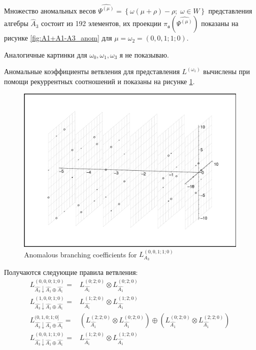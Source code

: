 \documentclass[a4paper,12pt]{article}
\theoremstyle{definition} \newtheorem{Def}{Definition}
\begin{document}
Множество аномальных весов  $\widehat{\Psi^{(\mu)}}=\left\{\omega(\mu+\rho)-\rho;\; \omega\in
  W\right\}$ представления алгебры $\hat{A}_3$ состоит из 192 элементов, их проекции
$\pi_{\mathfrak{a}}\left(\widehat{\Psi^{(\mu)}}\right)$ показаны на рисунке  \ref{fig:A1+A1-A3_anom}
для $\mu=\omega_2=(0,0,1;1;0)$.

Аналогичные картинки для $\omega_0, \omega_1,\omega_3$ я не показываю.

Аномальные коэффициенты ветвления для представления  $L^{(\omega_1)}$ вычислены при помощи
рекуррентных соотношений и показаны на рисунке \ref{fig:A1+A1-A3_branching}. 
\begin{figure}[h!tb]
  \includegraphics[width=180mm]{A1+A1-A3_branching.pdf}
  \caption{Anomalous branching coefficients for $L^{(0,0,1;1;0)}_{A_3}$}
  \label{fig:A1+A1-A3_branching}
\end{figure}

Получаются следующие правила ветвления:
 \begin{equation}
   \label{eq:39}
   \begin{array}{ll}
     L^{(0,0,0;1;0)}_{\hat{A_3}\downarrow \hat{A_1}\oplus \hat{A_1}}= & L_{\hat{A_1}}^{(0;2;0)}\otimes L_{\hat{A_1}}^{(0;2;0)} \\
     L^{(1,0,0;1;0)}_{\hat{A_3}\downarrow \hat{A_1}\oplus \hat{A_1}}= & L_{\hat{A_1}}^{(1;2;0)}\otimes L_{\hat{A_1}}^{(1;2;0)} \\
     L^{(0,1,0;1;0]}_{\hat{A_3}\downarrow \hat{A_1}\oplus \hat{A_1}}= & \left( L_{\hat{A_1}}^{(2;2;0)}\otimes L_{\hat{A_1}}^{(0;2;0)}\right) \oplus \left( L_{\hat{A_1}}^{(0;2;0)}\otimes L_{\hat{A_1}}^{(2;2;0)}\right) \\
     L^{(0,0,1;1;0)}_{\hat{A_3}\downarrow \hat{A_1}\oplus \hat{A_1}}= & L_{\hat{A_1}}^{(1;2;0)}\otimes L_{\hat{A_1}}^{(1;2;0)} \\     
   \end{array}
 \end{equation}
\end{document}
